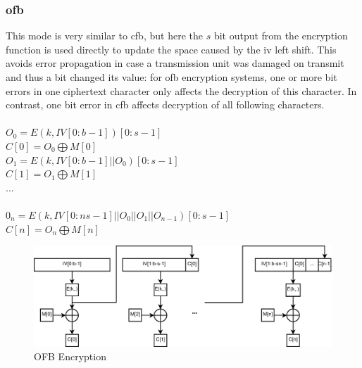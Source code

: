 \subsubsection{\gls{ofb}}
This mode is very similar to \gls{cfb}, but here the $s$ bit output from the encryption function is used directly to update the space caused by the \gls{iv} 
left shift. This avoids error propagation in case a transmission unit was damaged on transmit and thus a bit changed its value:
for \gls{ofb} encryption systems, one or more bit errors in one ciphertext character only affects the decryption of this character. In contrast, one bit error in \gls{cfb} affects
decryption of all following characters.
\\
\\
$O_0 = E(k, IV[0:b-1])[0:s-1]$\\
$C[0] = O_0 \bigoplus M[0]$\\
 $O_1 = E(k, IV[0:b-1] || O_0)[0:s-1]$\\
 $C[1] = O_1 \bigoplus M[1]$\\
 ... \\
 \\
 $0_n = E(k, IV[0:ns-1] || O_0 || O_1 || O_{n-1})[0:s-1]$\\
 $C[n] = O_n \bigoplus M[n]$\\

\begin{figure}
    \centering
    \includegraphics[width=1\textwidth]{figures/OFB.eps}
    \caption{OFB Encryption}
    \label{fig:ofb}
\end{figure}

